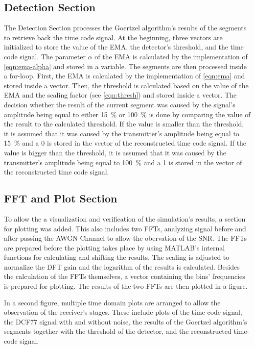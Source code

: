 \documentclass[conference]{IEEEtran}
\begin{document}
\subsection{Detection Section}
The Detection Section processes the Goertzel algorithm's results of the segments to retrieve back the time code signal.
At the beginning, three vectors are initialized to store the value of the EMA, the detector's threshold, and the time code signal.
The parameter $\alpha$ of the EMA is calculated by the implementation of \eqref{eqn:ema-alpha} and stored in a variable.
The segments are then processed inside a for-loop.
First, the EMA is calculated by the implementation of \eqref{eqn:ema} and stored inside a vector.
Then, the threshold is calculated based on the value of the EMA and the scaling factor (see \eqref{eqn:thresh}) and stored inside a vector.
The decision whether the result of the current segment was caused by the signal's amplitude being equal to either \SI{15}{\percent} or
\SI{100}{\percent} is done by comparing the value of the result to the calculated threshold.
If the value is smaller than the threshold, it is assumed that it was caused by the transmitter's amplitude being equal to \SI{15}{\percent} and
a 0 is stored in the vector of the reconstructed time code signal.
If the value is bigger than the threshold, it is assumed that it was caused by the transmitter's amplitude being equal to \SI{100}{\percent} and a 1 is stored in the vector of the reconstructed time code signal.

\subsection{FFT and Plot Section}
To allow the a visualization and verification of the simulation's results, a section for plotting was added.
This also includes two FFTs, analyzing signal before and after passing the AWGN-Channel to allow the obervation of the SNR.
The FFTs are prepared before the plotting takes place by using MATLAB's internal functions for calculating and shifting the results.
The scaling is adjusted to normalize the DFT gain and the logarithm of the results is calculated.
Besides the calculation of the FFTs themselves, a vector containing the bins' frequencies is prepared for plotting.
The results of the two FFTs are then plotted in a figure.
\par
In a second figure, multiple time domain plots are arranged to allow the observation of the receiver's stages.
These include plots of the time code signal, the DCF77 signal with and without noise, the results of the Goertzel algorithm's segments together with the threshold of the detector, and the reconstructed time-code signal.
\end{document}
